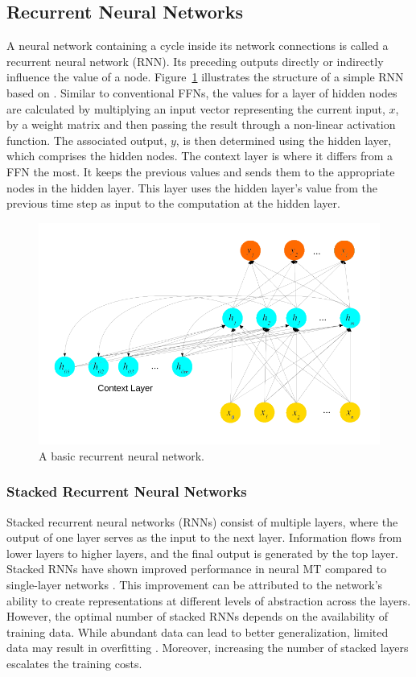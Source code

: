 \subsection{Recurrent Neural Networks}
A neural network containing a cycle inside its network connections is called a recurrent neural network (RNN). 
Its preceding outputs directly or indirectly influence the value of a node. 
Figure~\ref{fig:rnn} illustrates the structure of a simple RNN based on \cite{elman90}. 
Similar to conventional FFNs, the values for a layer of hidden nodes are calculated by multiplying an input vector representing the current input, $x$, by a weight matrix and then passing the result through a non-linear activation function. 
The associated output, $y$, is then determined using the hidden layer, which comprises the hidden nodes. 
The context layer is where it differs from a FFN the most. 
It keeps the previous values and sends them to the appropriate nodes in the hidden layer. 
This layer uses the hidden layer’s value from the previous time step as input to the computation at the hidden layer.
\begin{figure}[h]
	\centering
	\includegraphics[width=0.7\linewidth]{Figures/RNN}
	\caption{A basic recurrent neural network.}
	\label{fig:rnn}
\end{figure}

\subsubsection{Stacked Recurrent Neural Networks} 
Stacked recurrent neural networks (RNNs) consist of multiple layers, where the output of one layer serves as the input to the next layer. 
Information flows from lower layers to higher layers, and the final output is generated by the top layer. 
Stacked RNNs have shown improved performance in neural MT compared to single-layer networks \cite{bahdanau15}. 
This improvement can be attributed to the network's ability to create representations at different levels of abstraction across the layers. 
However, the optimal number of stacked RNNs depends on the availability of training data. 
While abundant data can lead to better generalization, limited data may result in overfitting \cite{lample18}. 
Moreover, increasing the number of stacked layers escalates the training costs.

